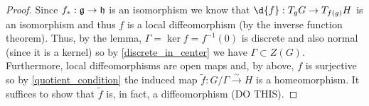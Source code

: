 \documentclass[12pt]{extarticle}
\begin{document}
\begin{proof}
Since $f_* : \mathfrak{g} \to \mathfrak{h}$ is an isomorphism we know that $\d{f} : T_g G \to T_{f(g)} H$ is an isomorphism and thus $f$ is a local diffeomorphism (by the inverse function theorem). Thus, by the lemma, $\Gamma = \ker{f} = f^{-1}(0)$ is discrete and also normal (since it is a kernel) so by \ref{discrete_in_center} we have $\Gamma \subset Z(G)$. Furthermore, local diffeomorphisms are open maps and, by above, $f$ is surjective so by \ref{quotient_condition} the induced map $\tilde{f} : G / \Gamma \xrightarrow{\sim} H$ is a homeomorphism. It suffices to show that $\tilde{f}$ is, in fact, a diffeomorphism (DO THIS).
\end{proof}
\end{document}
